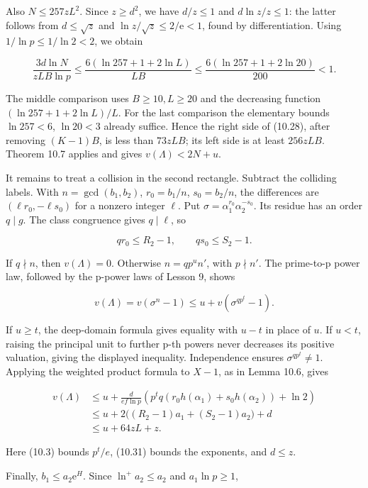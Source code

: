 \documentclass[
  11pt,
  a4paper,
]{article}
\begin{document}
Also \(N\le257zL^2\). Since \(z\ge d^2\), we have \(d/z\le1\) and
\(d\ln z/z\le1\): the latter follows from \(d\le\sqrt z\) and
\(\ln z/\sqrt z\le2/\mathrm e<1\), found by differentiation. Using
\(1/\ln p\le1/\ln2<2\), we obtain

\[
\frac{3d\ln N}{zLB\ln p}
\le\frac{6(\ln257+1+2\ln L)}{LB}
\le\frac{6(\ln257+1+2\ln20)}{200}<1.
\tag{10.30}
\]

The middle comparison uses \(B\ge10,L\ge20\) and the decreasing function
\((\ln257+1+2\ln L)/L\). For the last comparison the elementary bounds
\(\ln257<6\), \(\ln20<3\) already suffice. Hence the right side of
(10.28), after removing \((K-1)B\), is less than \(73zLB\); its left
side is at least \(256zLB\). Theorem 10.7 applies and gives
\(v(\Lambda)<2N+u\).

It remains to treat a collision in the second rectangle. Subtract the
colliding labels. With \(n=\gcd(b_1,b_2)\), \(r_0=b_1/n\),
\(s_0=b_2/n\), the differences are \((\ell r_0,-\ell s_0)\) for a
nonzero integer \(\ell\). Put \(\sigma=\alpha_1^{r_0}\alpha_2^{-s_0}\).
Its residue has an order \(q\mid g\). The class congruence gives
\(q\mid\ell\), so

\[
q r_0\le R_2-1,\qquad q s_0\le S_2-1.
\tag{10.31}
\]

If \(q\nmid n\), then \(v(\Lambda)=0\). Otherwise \(n=q p^u n'\), with
\(p\nmid n'\). The prime-to-p power law, followed by the p-power laws of
Lesson 9, shows

\[
v(\Lambda)=v(\sigma^n-1)
\le u+v(\sigma^{q p^t}-1).
\]

If \(u\ge t\), the deep-domain formula gives equality with \(u-t\) in
place of \(u\). If \(u<t\), raising the principal unit to further p-th
powers never decreases its positive valuation, giving the displayed
inequality. Independence ensures \(\sigma^{q p^t}\ne1\). Applying the
weighted product formula to \(X-1\), as in Lemma 10.6, gives

\[
\begin{aligned}
v(\Lambda)
&\le u+\frac d{ef\ln p}
\left(p^tq(r_0h(\alpha_1)+s_0h(\alpha_2))+\ln2\right)\\
&\le u+2\bigl((R_2-1)a_1+(S_2-1)a_2\bigr)+d\\
&\le u+64zL+z.
\end{aligned}
\tag{10.32}
\]

Here (10.3) bounds \(p^t/e\), (10.31) bounds the exponents, and
\(d\le z\).

Finally, \(b_1\le a_2\mathrm e^H\). Since \(\ln^+a_2\le a_2\) and
\(a_1\ln p\ge1\),
\end{document}
